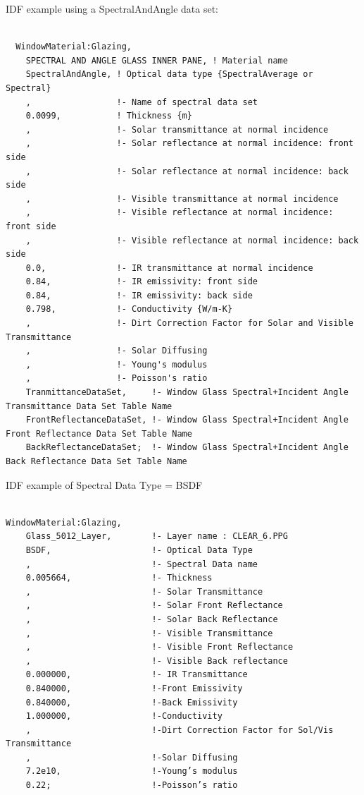 IDF example using a SpectralAndAngle data set:

\begin{lstlisting}

  WindowMaterial:Glazing,
    SPECTRAL AND ANGLE GLASS INNER PANE, ! Material name
    SpectralAndAngle, ! Optical data type {SpectralAverage or Spectral}
    ,                 !- Name of spectral data set
    0.0099,           ! Thickness {m}
    ,                 !- Solar transmittance at normal incidence
    ,                 !- Solar reflectance at normal incidence: front side
    ,                 !- Solar reflectance at normal incidence: back side
    ,                 !- Visible transmittance at normal incidence
    ,                 !- Visible reflectance at normal incidence: front side
    ,                 !- Visible reflectance at normal incidence: back side
    0.0,              !- IR transmittance at normal incidence
    0.84,             !- IR emissivity: front side
    0.84,             !- IR emissivity: back side
    0.798,            !- Conductivity {W/m-K}
    ,                 !- Dirt Correction Factor for Solar and Visible Transmittance
    ,                 !- Solar Diffusing
    ,                 !- Young's modulus
    ,                 !- Poisson's ratio
    TranmittanceDataSet,     !- Window Glass Spectral+Incident Angle Transmittance Data Set Table Name
    FrontReflectanceDataSet, !- Window Glass Spectral+Incident Angle Front Reflectance Data Set Table Name
    BackReflectanceDataSet;  !- Window Glass Spectral+Incident Angle Back Reflectance Data Set Table Name

\end{lstlisting}

IDF example of Spectral Data Type = BSDF

\begin{lstlisting}

WindowMaterial:Glazing,
    Glass_5012_Layer,        !- Layer name : CLEAR_6.PPG
    BSDF,                    !- Optical Data Type
    ,                        !- Spectral Data name
    0.005664,                !- Thickness
    ,                        !- Solar Transmittance
    ,                        !- Solar Front Reflectance
    ,                        !- Solar Back Reflectance
    ,                        !- Visible Transmittance
    ,                        !- Visible Front Reflectance
    ,                        !- Visible Back reflectance
    0.000000,                !- IR Transmittance
    0.840000,                !-Front Emissivity
    0.840000,                !-Back Emissivity
    1.000000,                !-Conductivity
    ,                        !-Dirt Correction Factor for Sol/Vis Transmittance
    ,                        !-Solar Diffusing
    7.2e10,                  !-Young’s modulus
    0.22;                    !-Poisson’s ratio
\end{lstlisting}

